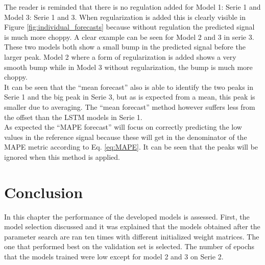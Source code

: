 The reader is reminded that there is no regulation added for Model 1: Serie 1 and Model 3: Serie 1 and 3. When regularization is added this is clearly visible in Figure \ref{fig:individual_forecasts} because without regulation the predicted signal is much more choppy. A clear example can be seen for Model 2 and 3 in serie 3. These two models both show a small bump in the predicted signal before the larger peak. Model 2 where a form of regularization is added shows a very smooth bump while in Model 3 without regularization, the bump is much more choppy. \\

It can be seen that the ``mean forecast'' also is able to identify the two peaks in Serie 1 and the big peak in Serie 3, but as is expected from a mean, this peak is smaller due to averaging. The ``mean forecast'' method however suffers less from the offset than the LSTM models in Serie 1.\\

As expected the ``MAPE forecast'' will focus on correctly predicting the low values in the reference signal because these will get in the denominator of the MAPE metric according to Eq. \ref{eq:MAPE}. It can be seen that the peaks will be ignored when this method is applied. 

\section{Conclusion}
In this chapter the performance of the developed models is assessed. First, the model selection discussed and it was explained that the models obtained after the parameter search are ran ten times with different initialized weight matrices. The one that performed best on the validation set is selected. The number of epochs that the models trained were low except for model 2 and 3 on Serie 2.\\

